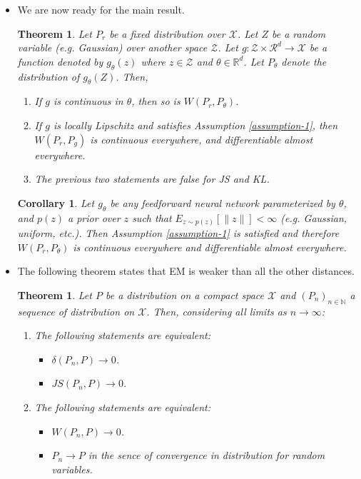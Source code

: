 \documentclass[10pt]{article}
\newtheorem{theorem}[lemma]{Theorem}
\newtheorem{corollary}[lemma]{Corollary}
\begin{document}
\begin{itemize}
  	\item We are now ready for the main result.
  	\begin{theorem}
  		Let $P_r$ be a fixed distribution over $\mathcal{X}$. Let $Z$ be a random variable (e.g. Gaussian) over another space $\mathcal{Z}$. Let $g: \mathcal{Z} \times \mathcal{R}^d \rightarrow \mathcal{X}$ be a function denoted by $g_\theta(z)$ where $z \in \mathcal{Z}$ and $\theta \in \mathbb{R}^d$. Let $P_\theta$ denote the distribution of $g_\theta(Z)$. Then,
  		\begin{enumerate}
  			\item If $g$ is continuous in $\theta$, then so is $W(P_r, P_\theta)$.
  			\item If $g$ is locally Lipschitz and satisfies Assumption \ref{assumption-1}, then $W(P_r, P_g)$ is continuous everywhere, and differentiable almost everywhere.
  			\item The previous two statements are false for JS and KL.
  		\end{enumerate}
  	\end{theorem}

  	\begin{corollary}
  		Let $g_\theta$ be any feedforward neural network parameterized by $\theta$, and $p(z)$ a prior over $z$ such that $E_{z \sim p(z)} [\|z\|] < \infty$ (e.g. Gaussian, uniform, etc.). Then Assumption \ref{assumption-1} is satisfied and therefore $W(P_r, P_\theta)$ is continuous everywhere and differentiable almost everywhere.
  	\end{corollary}

  	\item The following theorem states that EM is weaker than all the other distances.
  	\begin{theorem}
  		Let $P$ be a distribution on a compact space $\mathcal{X}$ and $(P_n)_{n \in \mathbb{N}}$ a sequence of distribution on $\mathcal{X}$. Then, considering all limits as $n \rightarrow \infty$:
  		\begin{enumerate}
  			\item  The following statements are equivalent:
  			\begin{itemize}
  				\item $\delta(P_n, P) \rightarrow 0$.
  				\item $JS(P_n, P) \rightarrow 0$.
  			\end{itemize}

  			\item The following statements are equivalent:
  			\begin{itemize}
  				\item $W(P_n, P) \rightarrow 0$.
  				\item $P_n \rightarrow P$ in the sence of convergence in distribution for random variables.
  			\end{itemize}


\end{enumerate}
\end{theorem}
\end{itemize}
\end{document}
